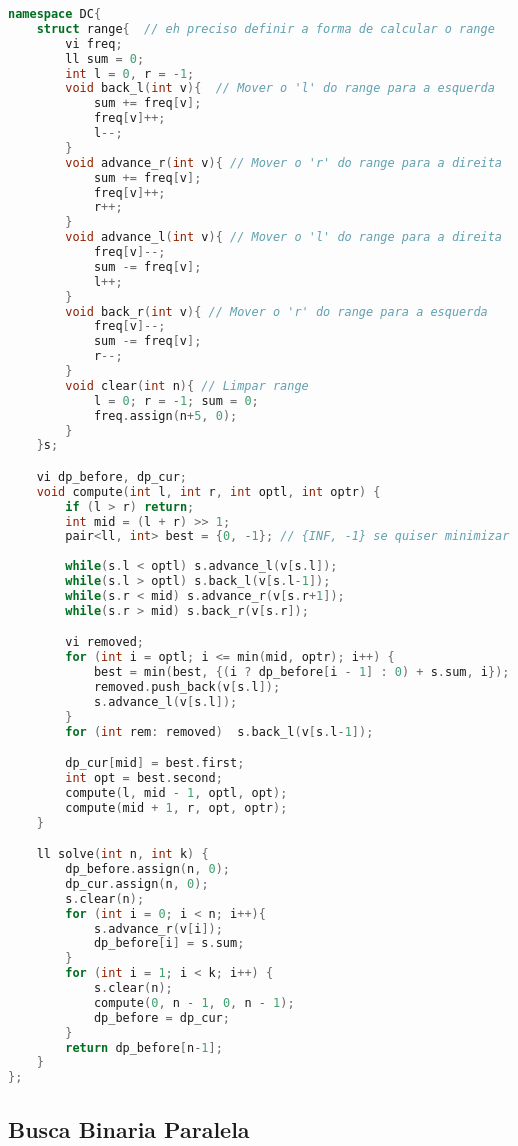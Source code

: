 \documentclass[11pt, a4paper, twoside]{article}
\begin{document}
\begin{lstlisting}[language=C++]
namespace DC{
    struct range{  // eh preciso definir a forma de calcular o range
        vi freq; 
        ll sum = 0;
        int l = 0, r = -1;
        void back_l(int v){  // Mover o 'l' do range para a esquerda
            sum += freq[v];
            freq[v]++;
            l--;
        }
        void advance_r(int v){ // Mover o 'r' do range para a direita
            sum += freq[v];
            freq[v]++;
            r++;
        }
        void advance_l(int v){ // Mover o 'l' do range para a direita
            freq[v]--;
            sum -= freq[v];
            l++;
        }
        void back_r(int v){ // Mover o 'r' do range para a esquerda
            freq[v]--;
            sum -= freq[v];
            r--;
        }
        void clear(int n){ // Limpar range
            l = 0; r = -1; sum = 0;
            freq.assign(n+5, 0);
        }
    }s;

    vi dp_before, dp_cur;
    void compute(int l, int r, int optl, int optr) {
        if (l > r) return;
        int mid = (l + r) >> 1;
        pair<ll, int> best = {0, -1}; // {INF, -1} se quiser minimizar
        
        while(s.l < optl) s.advance_l(v[s.l]);
        while(s.l > optl) s.back_l(v[s.l-1]);
        while(s.r < mid) s.advance_r(v[s.r+1]);
        while(s.r > mid) s.back_r(v[s.r]);

        vi removed;
        for (int i = optl; i <= min(mid, optr); i++) {
            best = min(best, {(i ? dp_before[i - 1] : 0) + s.sum, i}); // min() se quiser minimizar
            removed.push_back(v[s.l]);
            s.advance_l(v[s.l]);
        }
        for (int rem: removed)  s.back_l(v[s.l-1]);

        dp_cur[mid] = best.first;
        int opt = best.second;
        compute(l, mid - 1, optl, opt);
        compute(mid + 1, r, opt, optr);
    }

    ll solve(int n, int k) {
        dp_before.assign(n, 0);
        dp_cur.assign(n, 0);
        s.clear(n);
        for (int i = 0; i < n; i++){
            s.advance_r(v[i]);
            dp_before[i] = s.sum;
        }
        for (int i = 1; i < k; i++) {
            s.clear(n);
            compute(0, n - 1, 0, n - 1);
            dp_before = dp_cur;
        }
        return dp_before[n-1];
    }
};
\end{lstlisting}

\subsection{Busca Binaria Paralela}
\end{document}
